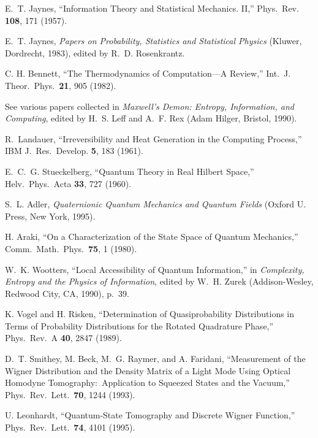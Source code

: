 \begin{thebibliography}{10}
E.~T. Jaynes, ``Information Theory and Statistical Mechanics. II,''
Phys.\ Rev. {\bf 108}, 171 (1957).

E.~T. Jaynes, {\sl Papers on Probability, Statistics and Statistical
Physics\/} (Kluwer, Dordrecht, 1983), edited by R.~D. Rosenkrantz.

C. H. Bennett, ``The Thermodynamics of Computation---A Review,''
Int.\ J. Theor.\ Phys.\ {\bf 21}, 905 (1982).

See various papers collected in {\sl Maxwell's Demon: Entropy,
Information, and Computing}, edited by H.~S. Leff and A.~F. Rex
(Adam Hilger, Bristol, 1990).

R.~Landauer, ``Irreversibility and Heat Generation in the Computing
Process,'' IBM J.\ Res.\ Develop. {\bf 5}, 183 (1961).

E.~C.~G. Stueckelberg, ``Quantum Theory in Real Hilbert Space,''
Helv.\ Phys.\ Acta {\bf 33}, 727 (1960).

S.~L. Adler, {\sl Quaternionic Quantum Mechanics and Quantum
Fields\/} (Oxford U. Press, New York, 1995).

H. Araki, ``On a Characterization of the State Space of Quantum
Mechanics,'' Comm.\ Math.\ Phys.\ {\bf 75}, 1 (1980).

W.~K. Wootters, ``Local Accessibility of Quantum Information,'' in
{\sl Complexity, Entropy and the Physics of Information}, edited by
W.~H. Zurek (Addison-Wesley, Redwood City, CA, 1990), p.~39.

K. Vogel and H. Risken, ``Determination of Quasiprobability
Distributions in Terms of Probability Distributions for the Rotated
Quadrature Phase,'' Phys.\ Rev.\ A {\bf 40}, 2847 (1989).

D.~T. Smithey, M. Beck, M.~G. Raymer, and A. Faridani, ``Measurement
of the Wigner Distribution and the Density Matrix of a Light Mode
Using Optical Homodyne Tomography:\ Application to Squeezed States
and the Vacuum,'' Phys.\ Rev.\ Lett.\ {\bf 70},  1244  (1993).

U. Leonhardt, ``Quantum-State Tomography and Discrete Wigner
Function,'' Phys.\ Rev.\ Lett.\ {\bf 74}, 4101 (1995).


\end{thebibliography}
